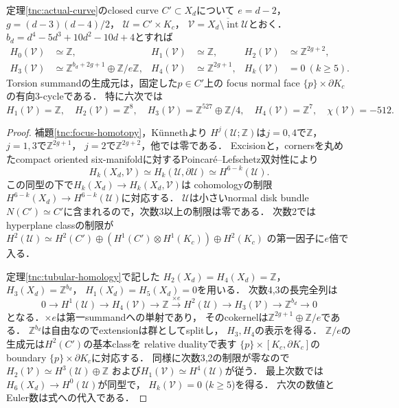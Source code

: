\begin{theorem}
\label{tnc:actual-complement-homology}
定理\ref{tnc:actual-curve}のclosed curve
$C'\subset X_d$について
$e=d-2$，$g=(d-3)(d-4)/2$，
$\mathcal U=C'\times K_c$，
$\mathcal V=\overline{X_d\setminus\operatorname{int}\mathcal U}$とおく．
$b_d=d^4-5d^3+10d^2-10d+4$とすれば
\begin{equation}\label{tnc:actual-complement-groups}
\begin{aligned}
 H_0(\mathcal V)&\simeq\mathbb Z,&
 H_1(\mathcal V)&\simeq\mathbb Z,&
 H_2(\mathcal V)&\simeq\mathbb Z^{2g+2},\\
 H_3(\mathcal V)&\simeq
  \mathbb Z^{b_d+2g+1}\oplus\mathbb Z/e\mathbb Z,&
 H_4(\mathcal V)&\simeq\mathbb Z^{2g+1},&
 H_k(\mathcal V)&=0\ (k\ge5).
\end{aligned}
\end{equation}
Torsion summandの生成元は，固定した$p\in C'$上の
focus normal face $\{p\}\times\partial K_c$の有向3-cycleである．
特に六次では
\[
 H_1(\mathcal V)=\mathbb Z,\quad
 H_2(\mathcal V)=\mathbb Z^8,\quad
 H_3(\mathcal V)=\mathbb Z^{527}\oplus\mathbb Z/4,\quad
 H_4(\mathcal V)=\mathbb Z^7,\quad
 \chi(\mathcal V)=-512.
\]
\end{theorem}
\begin{proof}
補題\ref{tnc:focus-homotopy}，K\"unnethより
$H^j(\mathcal U;\mathbb Z)$は$j=0,4$で$\mathbb Z$，
$j=1,3$で$\mathbb Z^{2g+1}$，
$j=2$で$\mathbb Z^{2g+2}$，他では零である．
Excisionと，cornersを丸めたcompact oriented
six-manifoldに対するPoincar\'e--Lefschetz双対性により
\[
 H_k(X_d,\mathcal V)\simeq
 H_k(\mathcal U,\partial\mathcal U)
 \simeq H^{6-k}(\mathcal U).
\]
この同型の下で$H_k(X_d)\to H_k(X_d,\mathcal V)$は
cohomologyの制限$H^{6-k}(X_d)\to H^{6-k}(\mathcal U)$に対応する．
$\mathcal U$は小さいnormal disk bundle
$N(C')\simeq C'$に含まれるので，次数3以上の制限は零である．
次数2ではhyperplane classの制限が
$H^2(\mathcal U)\simeq H^2(C')\oplus
(H^1(C')\otimes H^1(K_c))\oplus H^2(K_c)$
の第一因子に$e$倍で入る．

定理\ref{tnc:tubular-homology}で記した
$H_2(X_d)=H_4(X_d)=\mathbb Z$，
$H_3(X_d)=\mathbb Z^{b_d}$，
$H_1(X_d)=H_5(X_d)=0$を用いる．
次数4,3の長完全列は
\[
 0\to H^1(\mathcal U)\to H_4(\mathcal V)
 \to\mathbb Z\xrightarrow{\times e}H^2(\mathcal U)
 \to H_3(\mathcal V)\to\mathbb Z^{b_d}\to0
\]
となる．$\times e$は第一summandへの単射であり，
そのcokernelは$\mathbb Z^{2g+1}\oplus\mathbb Z/e$である．
$\mathbb Z^{b_d}$は自由なのでextensionは群としてsplitし，
$H_3,H_4$の表示を得る．
$\mathbb Z/e$の生成元は$H^2(C')$の基本classを
relative dualityで表す
$\{p\}\times[K_c,\partial K_c]$のboundary
$\{p\}\times\partial K_c$に対応する．
同様に次数3,2の制限が零なので
$H_2(\mathcal V)\simeq H^3(\mathcal U)\oplus\mathbb Z$
および$H_1(\mathcal V)\simeq H^4(\mathcal U)$が従う．
最上次数では$H_6(X_d)\to H^0(\mathcal U)$が同型で，
$H_k(\mathcal V)=0$ ($k\ge5$)を得る．
六次の数値とEuler数は式への代入である．
\end{proof}

